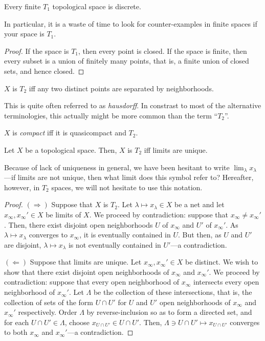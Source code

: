 \begin{crl}
Every finite $T_1$ topological space is discrete.
\begin{rmk}
In particular, it is a waste of time to look for counter-examples in finite spaces if your space is $T_1$.
\end{rmk}
\begin{proof}
If the space is $T_1$, then every point is closed.  If the space is finite, then every subset is a union of finitely many points, that is, a finite union of closed sets, and hence closed.
\end{proof}
\end{crl}
\begin{dfn}[$T_2$]\label{T2}
$X$ is \emph{$T_2$} iff any two distinct points are separated by neighborhoods.
\begin{rmk}
This is quite often referred to as \emph{hausdorff}.  In constrast to most of the alternative terminologies, this actually might be more common than the term ``$T_2$''.
\end{rmk}
\end{dfn}
\begin{dfn}[Compact]\label{Compact}
$X$ is \emph{compact} iff it is quasicompact and $T_2$.
\end{dfn}
\begin{prp}\label{prp4.5.37}
Let $X$ be a topological space.  Then, $X$ is $T_2$ iff limits are unique.
\begin{rmk}
Because of lack of uniqueness in general, we have been hesitant to write $\lim _\lambda x_\lambda$---if limits are not unique, then what limit does this symbol refer to?  Hereafter, however, in $T_2$ spaces, we will not hesitate to use this notation.
\end{rmk}
\begin{proof}
$(\Rightarrow )$ Suppose that $X$ is $T_2$.  Let $\lambda \mapsto x_\lambda \in X$ be a net and let $x_\infty ,x_\infty '\in X$ be limits of $X$.  We proceed by contradiction:  suppose that $x_\infty \neq x_\infty '$.  Then, there exist disjoint open neighborhoods $U$ of $x_\infty$ and $U'$ of $x_\infty '$.  As $\lambda \mapsto x_\lambda$ converges to $x_\infty$, it is eventually contained in $U$.  But then, as $U$ and $U'$ are disjoint, $\lambda \mapsto x_\lambda$ is not eventually contained in $U'$---a contradiction.

\blankline
\noindent
$(\Leftarrow )$ Suppose that limits are unique.  Let $x_\infty ,x_\infty '\in X$ be distinct.  We wish to show that there exist disjoint open neighborhoods of $x_\infty$ and $x_\infty '$.  We proceed by contradiction:  suppose that every open neighborhood of $x_\infty$ intersects every open neighborhood of $x_\infty '$.  Let $\Lambda$ be the collection of these intersections, that is, the collection of sets of the form $U\cap U'$ for $U$ and $U'$ open neighborhoods of $x_\infty$ and $x_\infty '$ respectively.  Order $\Lambda$ by reverse-inclusion so as to form a directed set, and for each $U\cap U'\in \Lambda$, choose $x_{U\cap U'}\in U\cap U'$.  Then, $\Lambda \ni U\cap U'\mapsto x_{U\cap U'}$ converges to both $x_\infty$ and $x_\infty'$---a contradiction.
\end{proof}
\end{prp}
